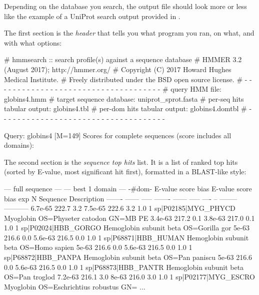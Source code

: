 
Depending on the database you search, the output file
 should look more or less like the example of a
UniProt search output provided in .

The first section is the \emph{header} that tells you what program you
ran, on what, and with what options:

\begin{sreoutput}
# hmmsearch :: search profile(s) against a sequence database
# HMMER 3.2 (August 2017); http://hmmer.org/
# Copyright (C) 2017 Howard Hughes Medical Institute.
# Freely distributed under the BSD open source license.
# - - - - - - - - - - - - - - - - - - - - - - - - - - - - - - - - - - - -
# query HMM file:                  globins4.hmm
# target sequence database:        uniprot_sprot.fasta
# per-seq hits tabular output:     globins4.tbl
# per-dom hits tabular output:     globins4.domtbl
# - - - - - - - - - - - - - - - - - - - - - - - - - - - - - - - - - - - -

Query:       globins4  [M=149]
Scores for complete sequences (score includes all domains):
\end{sreoutput}

The second section is the \emph{sequence top hits} list. It is a list
of ranked top hits (sorted by E-value, most significant hit first),
formatted in a BLAST-like style:

\begin{samepage}
\begin{sreoutput}
   --- full sequence ---   --- best 1 domain ---    -#dom-
    E-value  score  bias    E-value  score  bias    exp  N  Sequence              Description
    ------- ------ -----    ------- ------ -----   ---- --  --------              -----------
    6.7e-65  222.7   3.2    7.5e-65  222.6   3.2    1.0  1  sp|P02185|MYG_PHYCD    Myoglobin OS=Physeter catodon GN=MB PE
    3.4e-63  217.2   0.1    3.8e-63  217.0   0.1    1.0  1  sp|P02024|HBB_GORGO    Hemoglobin subunit beta OS=Gorilla gor
      5e-63  216.6   0.0    5.6e-63  216.5   0.0    1.0  1  sp|P68871|HBB_HUMAN    Hemoglobin subunit beta OS=Homo sapien
      5e-63  216.6   0.0    5.6e-63  216.5   0.0    1.0  1  sp|P68872|HBB_PANPA    Hemoglobin subunit beta OS=Pan paniscu
      5e-63  216.6   0.0    5.6e-63  216.5   0.0    1.0  1  sp|P68873|HBB_PANTR    Hemoglobin subunit beta OS=Pan troglod
    7.2e-63  216.1   3.0      8e-63  216.0   3.0    1.0  1  sp|P02177|MYG_ESCRO    Myoglobin OS=Eschrichtius robustus GN=
 ...      
\end{sreoutput}
\end{samepage}

